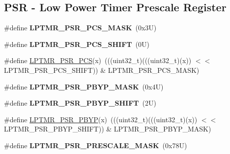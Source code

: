 \subsection*{P\+SR -\/ Low Power Timer Prescale Register}
\begin{DoxyCompactItemize}
\item 
\mbox{\label{group___l_p_t_m_r___register___masks_ga40daa10db43ec0c0a1944e6289ca29cc}} 
\#define {\bfseries L\+P\+T\+M\+R\+\_\+\+P\+S\+R\+\_\+\+P\+C\+S\+\_\+\+M\+A\+SK}~(0x3\+U)
\item 
\mbox{\label{group___l_p_t_m_r___register___masks_gaf258bce874ad60601d6d76cefc72c52e}} 
\#define {\bfseries L\+P\+T\+M\+R\+\_\+\+P\+S\+R\+\_\+\+P\+C\+S\+\_\+\+S\+H\+I\+FT}~(0\+U)
\item 
\#define \mbox{\hyperlink{group___l_p_t_m_r___register___masks_gabeba0b705770f53c56a569a5ee74536b}{L\+P\+T\+M\+R\+\_\+\+P\+S\+R\+\_\+\+P\+CS}}(x)~(((uint32\+\_\+t)(((uint32\+\_\+t)(x)) $<$$<$ L\+P\+T\+M\+R\+\_\+\+P\+S\+R\+\_\+\+P\+C\+S\+\_\+\+S\+H\+I\+FT)) \& L\+P\+T\+M\+R\+\_\+\+P\+S\+R\+\_\+\+P\+C\+S\+\_\+\+M\+A\+SK)
\item 
\mbox{\label{group___l_p_t_m_r___register___masks_gab3daae6085cf702b31db5be78fe03872}} 
\#define {\bfseries L\+P\+T\+M\+R\+\_\+\+P\+S\+R\+\_\+\+P\+B\+Y\+P\+\_\+\+M\+A\+SK}~(0x4\+U)
\item 
\mbox{\label{group___l_p_t_m_r___register___masks_ga4bb5021e396db697f5e597fdcdc222e3}} 
\#define {\bfseries L\+P\+T\+M\+R\+\_\+\+P\+S\+R\+\_\+\+P\+B\+Y\+P\+\_\+\+S\+H\+I\+FT}~(2\+U)
\item 
\#define \mbox{\hyperlink{group___l_p_t_m_r___register___masks_ga3d7c49e91df0f310a5dcf2effef9ae25}{L\+P\+T\+M\+R\+\_\+\+P\+S\+R\+\_\+\+P\+B\+YP}}(x)~(((uint32\+\_\+t)(((uint32\+\_\+t)(x)) $<$$<$ L\+P\+T\+M\+R\+\_\+\+P\+S\+R\+\_\+\+P\+B\+Y\+P\+\_\+\+S\+H\+I\+FT)) \& L\+P\+T\+M\+R\+\_\+\+P\+S\+R\+\_\+\+P\+B\+Y\+P\+\_\+\+M\+A\+SK)
\item 
\mbox{\label{group___l_p_t_m_r___register___masks_ga93a6fe3fb169a73716a837cedb92dbef}} 
\#define {\bfseries L\+P\+T\+M\+R\+\_\+\+P\+S\+R\+\_\+\+P\+R\+E\+S\+C\+A\+L\+E\+\_\+\+M\+A\+SK}~(0x78\+U)

\end{DoxyCompactItemize}

